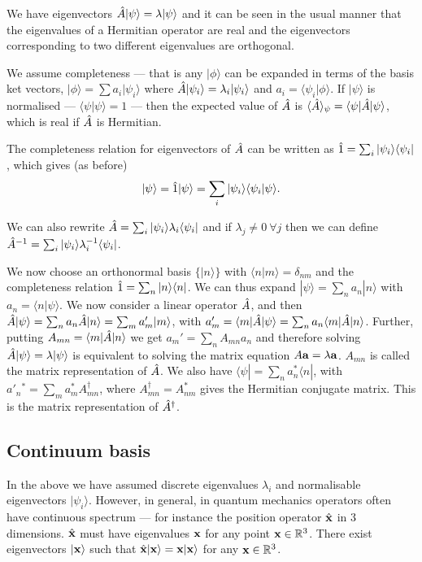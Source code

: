 \documentclass{notes}
\newcommand{\bra}[1]{\langle#1|}
\newcommand{\ket}[1]{|#1\rangle}
\newcommand{\scp}[2]{\langle#1|#2\rangle}
\begin{document}
We have eigenvectors $\Hat{A} \ket{\psi} = \lambda \ket{\psi}$ and
it can be seen in the usual manner that the eigenvalues of a Hermitian
operator are real and the eigenvectors corresponding to two different
eigenvalues are orthogonal.

We assume completeness --- that is any $\ket{\phi}$ can be expanded in terms
of the basis ket vectors,
$\ket{\phi} = \sum a_i \ket{\psi_i}$ where $\Hat{A} \ket{\psi_i}
= \lambda_i \ket{\psi_i}$ and $a_i = \scp{\psi_i}{\phi}$.  If
$\ket{\psi}$ is normalised --- $\scp{\psi}{\psi} = 1$ --- then the
expected value of $\Hat{A}$ is 
$\langle \Hat{A} \rangle_\psi = \bra{\psi} \Hat{A} \ket{\psi}$, which is
real if $\Hat{A}$ is Hermitian.

The completeness relation for eigenvectors of $\Hat{A}$ can be
written as
$\Hat{1} = \sum_i \ket{\psi_i} \bra{\psi_i}$, which gives (as before)
\[
\ket{\psi} = \Hat{1} \ket{\psi}
= \sum_i \ket{\psi_i} \scp{\psi_i}{\psi}.
\]

We can also rewrite $\Hat{A} = \sum_i \ket{\psi_i} \lambda_i
\bra{\psi_i}$ and if $\lambda_j \neq 0\ \forall j$ then we can define
$\Hat{A}^{-1} = \sum_i \ket{\psi_i} \lambda_i^{-1} \bra{\psi_i}$.

We now choose an orthonormal basis $\{ \ket{n} \}$ with
$\scp{n}{m} = \delta_{nm}$ and the completeness relation
$\Hat{1} = \sum_n \ket{n} \bra{n}$.  We can thus expand
$\ket{\psi} = \sum_n a_n \ket{n}$ with $a_n = \scp{n}{\psi}$.  We
now consider a linear operator $\Hat{A}$, and then
$\Hat{A} \ket{\psi} = \sum_n a_n \Hat{A} \ket{n} = \sum_m a_m' \ket{m}$,
with $a_m' = \bra{m} \Hat{A} \ket{\psi} = \sum_n a_n \bra{m} \Hat{A} \ket{n}$.
Further, putting $A_{mn} = \bra{m} \Hat{A} \ket{n}$ we get
$a_m' = \sum_n A_{mn} a_n$ and therefore solving
$\Hat{A} \ket{\psi} = \lambda \ket{\psi}$ is equivalent to solving the
matrix equation
$A \mathbf{a} = \lambda \mathbf{a}$.  $A_{mn}$ is called the matrix representation
of $\Hat{A}$.  We also have $\bra{\psi} = \sum_n a_n^\ast \bra{n}$, with
$a'_n{}^\ast = \sum_m a_m^\ast A^\dag_{m n}$, where
$A^\dag_{m n} = A_{n m}^\ast$ gives the Hermitian conjugate matrix.  This
is the matrix representation of $\Hat{A}^\dag$.

\subsection{Continuum basis}

In the above we have assumed discrete eigenvalues $\lambda_i$ and normalisable
eigenvectors $\ket{\psi_i}$.  However, in general, in quantum mechanics
operators often have continuous spectrum --- for instance the position operator
$\Hat{\mathbf{x}}$ in 3 dimensions.  $\Hat{\mathbf{x}}$ must have eigenvalues
$\mathbf{x}$ for any point $\mathbf{x} \in \mathbb{R}^3$.  There exist eigenvectors
$\ket{\vect{x}}$ such that $\Hat{\vect{x}} \ket{\vect{x}} =
\vect{x} \ket{\vect{x}}$ for any $\mathbf{x} \in \mathbb{R}^3$.
\end{document}

